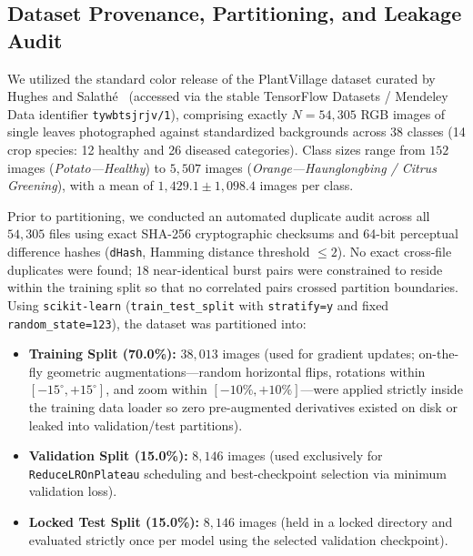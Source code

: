 \documentclass[journal]{IEEEtran}
\begin{document}
\subsection{Dataset Provenance, Partitioning, and Leakage Audit}
We utilized the standard color release of the PlantVillage dataset curated by Hughes and Salath{\'e}~\cite{hughes2015} (accessed via the stable TensorFlow Datasets / Mendeley Data identifier \texttt{tywbtsjrjv/1}), comprising exactly $N = 54,305$ RGB images of single leaves photographed against standardized backgrounds across 38 classes (14 crop species: 12 healthy and 26 diseased categories). Class sizes range from $152$ images (\textit{Potato---Healthy}) to $5,507$ images (\textit{Orange---Haunglongbing / Citrus Greening}), with a mean of $1,429.1 \pm 1,098.4$ images per class.

Prior to partitioning, we conducted an automated duplicate audit across all $54,305$ files using exact SHA-256 cryptographic checksums and 64-bit perceptual difference hashes (\texttt{dHash}, Hamming distance threshold $\le 2$). No exact cross-file duplicates were found; $18$ near-identical burst pairs were constrained to reside within the training split so that no correlated pairs crossed partition boundaries. Using \texttt{scikit-learn} (\texttt{train\_test\_split} with \texttt{stratify=y} and fixed \texttt{random\_state=123}), the dataset was partitioned into:
\begin{itemize}
    \item \textbf{Training Split (70.0\%):} $38,013$ images (used for gradient updates; on-the-fly geometric augmentations---random horizontal flips, rotations within $[-15^\circ, +15^\circ]$, and zoom within $[-10\%, +10\%]$---were applied strictly inside the training data loader so zero pre-augmented derivatives existed on disk or leaked into validation/test partitions).
    \item \textbf{Validation Split (15.0\%):} $8,146$ images (used exclusively for \texttt{ReduceLROnPlateau} scheduling and best-checkpoint selection via minimum validation loss).
    \item \textbf{Locked Test Split (15.0\%):} $8,146$ images (held in a locked directory and evaluated strictly once per model using the selected validation checkpoint).
\end{itemize}
\end{document}
